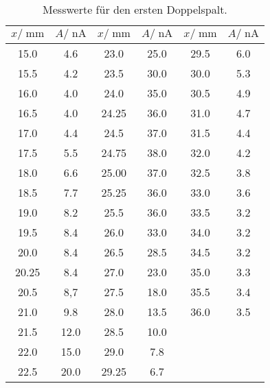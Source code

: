 \begin{table}
  \centering
   \begin{tabular}{S S| S S | S S}
    \toprule
    $x/\; \si{\mm}$& $A/\;\si{\nA}$ &
    $x/\; \si{\mm}$& $A/\;\si{\nA}$ &
    $x/\; \si{\mm}$& $A/\;\si{\nA}$ \\
    \midrule

    15.0& 4.6& 23.0& 25.0& 29.5& 6.0\\
    15.5& 4.2& 23.5& 30.0& 30.0& 5.3\\
    16.0& 4.0& 24.0& 35.0& 30.5& 4.9\\
    16.5& 4.0& 24.25& 36.0& 31.0& 4.7\\
    17.0& 4.4& 24.5& 37.0& 31.5& 4.4\\
    17.5& 5.5& 24.75& 38.0& 32.0& 4.2\\
    18.0& 6.6& 25.00& 37.0& 32.5& 3.8\\
    18.5& 7.7& 25.25& 36.0& 33.0& 3.6\\
    19.0& 8.2& 25.5& 36.0& 33.5& 3.2\\
    19.5& 8.4& 26.0& 33.0& 34.0& 3.2\\
    20.0& 8.4& 26.5& 28.5& 34.5& 3.2\\
    20.25& 8.4& 27.0& 23.0& 35.0& 3.3\\
    20.5& 8,7& 27.5& 18.0& 35.5& 3.4\\
    21.0& 9.8& 28.0& 13.5& 36.0& 3.5\\
    21.5& 12.0& 28.5& 10.0\\
    22.0& 15.0& 29.0& 7.8\\
    22.5& 20.0& 29.25& 6.7\\


   \bottomrule
  \end{tabular}
  \caption{Messwerte für den ersten Doppelspalt.}
  \label{tab:tabelle3}
\end{table}
